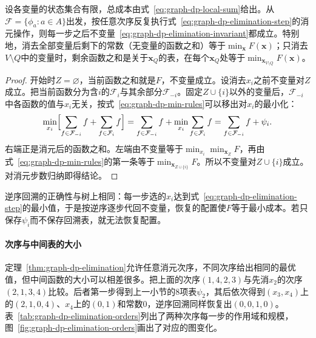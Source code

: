 \begin{theorem}[变量消元的正确性]
\label{thm:graph-dp-elimination}
设各变量的状态集合有限，总成本由式~\eqref{eq:graph-dp-local-sum}给出。从$\mathcal F=\{\phi_a:a\in A\}$出发，按任意次序反复执行式~\eqref{eq:graph-dp-elimination-step}的消元操作，则每一步之后不变量~\eqref{eq:graph-dp-elimination-invariant}都成立。特别地，消去全部变量后剩下的常数（无变量的函数之和）等于$\min_{\bm x}F(\bm x)$；只消去$V\setminus Q$中的变量时，剩余函数之和是关于$\bm x_Q$的表，在每个$\bm x_Q$处等于$\min_{\bm x_{V\setminus Q}}F(\bm x)$。
\end{theorem}

\begin{proof}
开始时$Z=\varnothing$，当前函数之和就是$F$，不变量成立。设消去$x_i$之前不变量对$Z$成立。把当前函数分为含$i$的$\mathcal F_i$与其余部分$\mathcal F_{-i}$。固定$Z\cup\{i\}$以外的变量后，$\mathcal F_{-i}$中各函数的值与$x_i$无关，按式~\eqref{eq:graph-dp-min-rules}可以移出对$x_i$的最小化：
\[
\min_{x_i}\Bigl[\sum_{f\in\mathcal F_{-i}}f+\sum_{f\in\mathcal F_i}f\Bigr]
=\sum_{f\in\mathcal F_{-i}}f+\min_{x_i}\sum_{f\in\mathcal F_i}f
=\sum_{f\in\mathcal F_{-i}}f+\psi_i .
\]
右端正是消元后的函数之和。左端由不变量等于$\min_{x_i}\min_{\bm x_Z}F$，再由式~\eqref{eq:graph-dp-min-rules}的第一条等于$\min_{\bm x_{Z\cup\{i\}}}F$。所以不变量对$Z\cup\{i\}$成立。对消元步数归纳即得结论。
\end{proof}

逆序回溯的正确性与树上相同：每一步选的$x_i$达到式~\eqref{eq:graph-dp-elimination-step}的最小值，于是按逆序逐步代回不变量，恢复的配置使$F$等于最小成本。若只保存$\psi_i$而不保存回溯表，就无法恢复配置。

\paragraph{次序与中间表的大小}
定理~\ref{thm:graph-dp-elimination}允许任意消元次序，不同次序给出相同的最优值，但中间函数的大小可以相差很多。把上面的次序$(1,4,2,3)$与先消$x_2$的次序$(2,1,3,4)$比较。后者第一步得到上一小节的$8$项表$\psi_2$，其后依次得到$(x_3,x_4)$上的$(2,1,0,4)$、$x_4$上的$(0,1)$和常数$0$，逆序回溯同样恢复出$(0,0,1,0)$。表~\ref{tab:graph-dp-elimination-orders}列出了两种次序每一步的作用域和规模，图~\ref{fig:graph-dp-elimination-orders}画出了对应的图变化。

